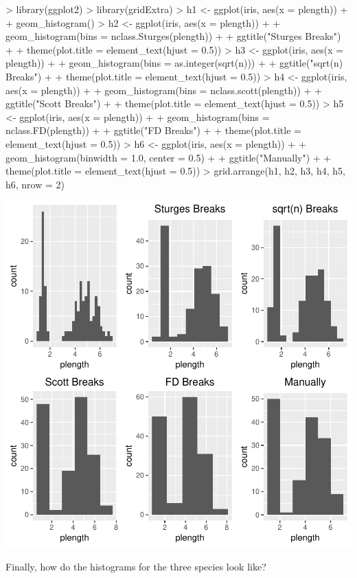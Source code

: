 \begin{Schunk}
\begin{Sinput}
> library(ggplot2)
> library(gridExtra)
> h1 <- ggplot(iris, aes(x = plength)) +
+   geom_histogram()
> h2 <- ggplot(iris, aes(x = plength)) +
+   geom_histogram(bins = nclass.Sturges(plength)) +
+   ggtitle("Sturges Breaks") +
+   theme(plot.title = element_text(hjust = 0.5))
> h3 <- ggplot(iris, aes(x = plength)) +
+   geom_histogram(bins = as.integer(sqrt(n))) +
+   ggtitle("sqrt(n) Breaks") +
+   theme(plot.title = element_text(hjust = 0.5))
> h4 <- ggplot(iris, aes(x = plength)) +
+   geom_histogram(bins = nclass.scott(plength)) +
+   ggtitle("Scott Breaks") +
+   theme(plot.title = element_text(hjust = 0.5))
> h5 <- ggplot(iris, aes(x = plength)) +
+   geom_histogram(bins = nclass.FD(plength)) +
+   ggtitle("FD Breaks") +
+   theme(plot.title = element_text(hjust = 0.5))
> h6 <- ggplot(iris, aes(x = plength)) +
+   geom_histogram(binwidth = 1.0, center = 0.5) +
+   ggtitle("Manually") +
+   theme(plot.title = element_text(hjust = 0.5))
> grid.arrange(h1, h2, h3, h4, h5, h6,  nrow = 2)
\end{Sinput}
\end{Schunk}
\includegraphics{lect_chapter5_v2-005}

Finally, how do the histograms for the three species look like?

